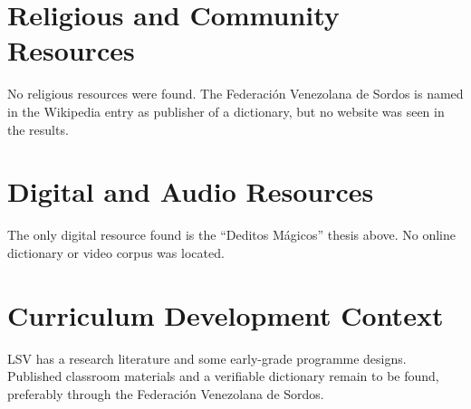 \documentclass[12pt]{article}
\begin{document}
\section{Religious and Community Resources}
No religious resources were found. The Federaci\'on Venezolana de Sordos is named in the Wikipedia entry as publisher of a dictionary, but no website was seen in the results.

\section{Digital and Audio Resources}
The only digital resource found is the ``Deditos M\'agicos'' thesis above. No online dictionary or video corpus was located.

\section{Curriculum Development Context}
LSV has a research literature and some early-grade programme designs. Published classroom materials and a verifiable dictionary remain to be found, preferably through the Federaci\'on Venezolana de Sordos.
\end{document}
